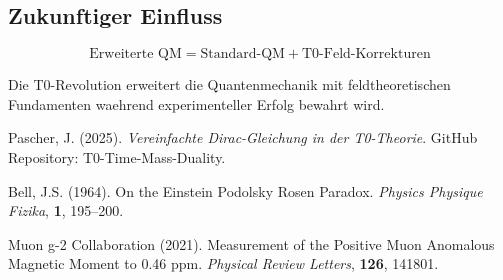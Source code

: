 \documentclass[12pt,a4paper]{article}
\begin{document}
	\subsection{Zukunftiger Einfluss}
	
	\begin{equation}
		\boxed{\text{Erweiterte QM} = \text{Standard-QM} + \text{T0-Feld-Korrekturen}}
	\end{equation}
	
	Die T0-Revolution erweitert die Quantenmechanik mit feldtheoretischen Fundamenten waehrend experimenteller Erfolg bewahrt wird.
	
	\begin{thebibliography}{99}
		Pascher, J. (2025). \textit{Vereinfachte Dirac-Gleichung in der T0-Theorie}. GitHub Repository: T0-Time-Mass-Duality.
		
		Bell, J.S. (1964). On the Einstein Podolsky Rosen Paradox. \textit{Physics Physique Fizika}, \textbf{1}, 195--200.
		
		Muon g-2 Collaboration (2021). Measurement of the Positive Muon Anomalous Magnetic Moment to 0.46 ppm. \textit{Physical Review Letters}, \textbf{126}, 141801.
	\end{thebibliography}
	
	
\end{document}

